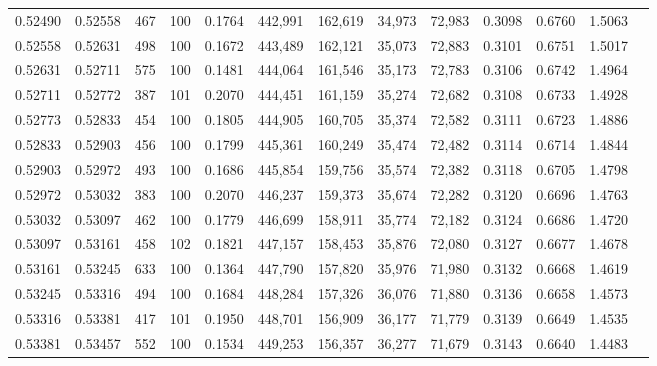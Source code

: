 \begin{tabular}{rrrrrrrrrrrrr}
0.52490 & 0.52558 &   467 & 100 &                                     0.1764 & 442,991 & 162,619 &  34,973 &  72,983 & 0.3098 & 0.6760 & 1.5063 \\
0.52558 & 0.52631 &   498 & 100 &                                     0.1672 & 443,489 & 162,121 &  35,073 &  72,883 & 0.3101 & 0.6751 & 1.5017 \\
0.52631 & 0.52711 &   575 & 100 &                                     0.1481 & 444,064 & 161,546 &  35,173 &  72,783 & 0.3106 & 0.6742 & 1.4964 \\
0.52711 & 0.52772 &   387 & 101 &                                     0.2070 & 444,451 & 161,159 &  35,274 &  72,682 & 0.3108 & 0.6733 & 1.4928 \\
0.52773 & 0.52833 &   454 & 100 &                                     0.1805 & 444,905 & 160,705 &  35,374 &  72,582 & 0.3111 & 0.6723 & 1.4886 \\
0.52833 & 0.52903 &   456 & 100 &                                     0.1799 & 445,361 & 160,249 &  35,474 &  72,482 & 0.3114 & 0.6714 & 1.4844 \\
0.52903 & 0.52972 &   493 & 100 &                                     0.1686 & 445,854 & 159,756 &  35,574 &  72,382 & 0.3118 & 0.6705 & 1.4798 \\
0.52972 & 0.53032 &   383 & 100 &                                     0.2070 & 446,237 & 159,373 &  35,674 &  72,282 & 0.3120 & 0.6696 & 1.4763 \\
0.53032 & 0.53097 &   462 & 100 &                                     0.1779 & 446,699 & 158,911 &  35,774 &  72,182 & 0.3124 & 0.6686 & 1.4720 \\
0.53097 & 0.53161 &   458 & 102 &                                     0.1821 & 447,157 & 158,453 &  35,876 &  72,080 & 0.3127 & 0.6677 & 1.4678 \\
0.53161 & 0.53245 &   633 & 100 &                                     0.1364 & 447,790 & 157,820 &  35,976 &  71,980 & 0.3132 & 0.6668 & 1.4619 \\
0.53245 & 0.53316 &   494 & 100 &                                     0.1684 & 448,284 & 157,326 &  36,076 &  71,880 & 0.3136 & 0.6658 & 1.4573 \\
0.53316 & 0.53381 &   417 & 101 &                                     0.1950 & 448,701 & 156,909 &  36,177 &  71,779 & 0.3139 & 0.6649 & 1.4535 \\
0.53381 & 0.53457 &   552 & 100 &                                     0.1534 & 449,253 & 156,357 &  36,277 &  71,679 & 0.3143 & 0.6640 & 1.4483 \\

\end{tabular}
